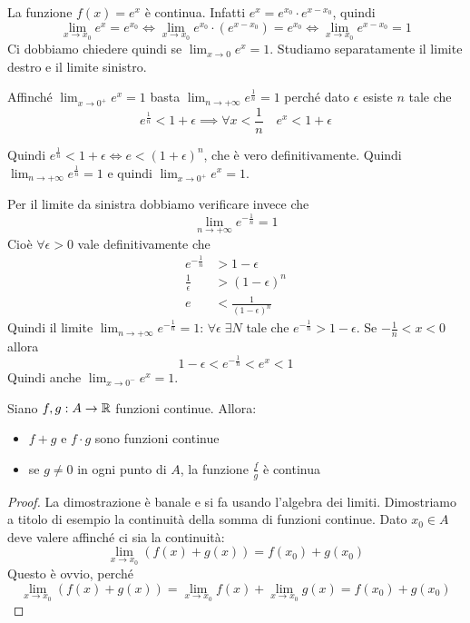 \begin{example}
La funzione $f(x) = e^x$ è continua. Infatti $e^x = e^{x_0} \cdot e^{x-x_0}$, quindi
\begin{equation*}
\lim_{x \to x_0} e^x = e^{x_0} \iff \lim_{x \to x_0} e^{x_0} \cdot (e^{x-x_0}) = e^{x_0} \iff \lim_{x \to x_0} e^{x-x_0} = 1
\end{equation*}
Ci dobbiamo chiedere quindi se $\lim_{x \to 0} e^x = 1$. Studiamo separatamente il limite destro e il limite sinistro.

Affinché $\lim_{x \to 0^+} e^x = 1$ basta $\lim_{n \to +\infty} e^{\frac{1}{n}} = 1$ perché dato $\epsilon$ esiste $n$ tale che
\begin{equation*}
e^\frac{1}{n} < 1 + \epsilon \implies \forall x < \frac{1}{n} \quad e^x < 1 + \epsilon
\end{equation*}

Quindi $e^\frac{1}{n} < 1 + \epsilon \iff e < (1+\epsilon)^n$, che è vero definitivamente. Quindi $\lim_{n \to +\infty} e^\frac{1}{n} = 1$ e quindi $\lim_{x \to 0^+} e^x = 1$.

Per il limite da sinistra dobbiamo verificare invece che
\begin{equation*}
\lim_{n \to +\infty} e^{-\frac{1}{n}} = 1
\end{equation*}
Cioè $\forall \epsilon > 0$ vale definitivamente che 
\begin{align*}
e^{-\frac{1}{n}} &> 1 - \epsilon\\
\frac{1}{\epsilon} &> (1 - \epsilon)^n \\
e &< \frac{1}{(1-\epsilon)^n}
\end{align*}
Quindi il limite $\lim_{n \to +\infty} e^{-\frac{1}{n}} = 1$: $\forall \epsilon \; \exists N$ tale che $e^{-\frac{1}{n}} > 1 - \epsilon$.
Se $-\frac{1}{n} < x < 0$ allora
\begin{equation*}
1 - \epsilon < e^{-\frac{1}{n}} < e^x < 1
\end{equation*}
Quindi anche $\lim_{x \to 0^-} e^x = 1$.
\end{example}

\begin{proposition}
Siano $f, g: A \to \mathbb R$ funzioni continue. Allora:
\begin{itemize}
\item $f + g$ e $f \cdot g$ sono funzioni continue
\item se $g \neq 0$ in ogni punto di $A$, la funzione $\frac{f}{g}$ è continua
\end{itemize}
\end{proposition}
\begin{proof}
La dimostrazione è banale e si fa usando l'algebra dei limiti. Dimostriamo a titolo di esempio la continuità della somma di funzioni continue. Dato $x_0 \in A$ deve valere affinché ci sia la continuità:
\begin{equation*}
\lim_{x \to x_0} (f(x)+g(x)) = f(x_0) + g(x_0)
\end{equation*}
Questo è ovvio, perché
\begin{equation*}
\lim_{x \to x_0} (f(x)+g(x)) = \lim_{x \to x_0} f(x) + \lim_{x \to x_0} g(x) = f(x_0) + g(x_0)
\end{equation*}
\end{proof}

